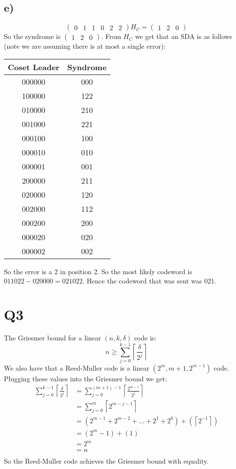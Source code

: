 \documentclass{article}
\begin{document}
\subsection*{e)}
$$\begin{pmatrix}0&1&1&0&2&2\end{pmatrix}H_C=\begin{pmatrix}1&2&0\end{pmatrix}$$
So the syndrome is $\begin{pmatrix}1&2&0\end{pmatrix}$. From $H_C$ we get that an SDA is as follows (note we are assuming there is at most a single error):
\begin{center}
\begin{tabular}{||c c||} 
 \hline
 Coset Leader &  Syndrome\\ [0.5ex] 
 \hline\hline
 000000 & 000\\ 
 \hline
 100000 & 122\\
 \hline
 010000 & 210\\
 \hline
 001000 & 221\\
 \hline
 000100 & 100\\
 \hline
 000010 & 010\\
 \hline
 000001 & 001\\
 \hline
 200000 & 211\\
 \hline
 020000 & 120\\
 \hline
 002000 & 112\\ 
 \hline
 000200 & 200\\
 \hline
 000020 & 020\\
 \hline
 000002 & 002\\  [1ex] 
 \hline
\end{tabular}
\end{center}
So the error is a 2 in position 2. So the most likely codeword is $011022-020000=021022$. Hence the codeword that was sent was $021$. 
\section*{Q3}
The Griesmer bound for a linear $(n,k,\delta)$ code is:
$$n\geq\sum_{j=0}^{k-1}\left\lceil\frac{\delta}{2^j}\right\rceil$$
We also have that a Reed-Muller code is a linear $(2^m,m+1,2^{m-1})$ code. Plugging these values into the Griesmer bound we get:
\begin{align*}
\sum_{j=0}^{k-1}\left\lceil\frac{\delta}{2^j}\right\rceil&=\sum_{j=0}^{(m+1)-1}\left\lceil\frac{2^{m-1}}{2^j}\right\rceil\\
&=\sum_{j=0}^{m}\left\lceil2^{m-j-1}\right\rceil\\
&=(2^{m-1}+2^{m-2}+...+2^{1}+2^{0})+\left(\left\lceil2^{-1}\right\rceil\right)\\
&=(2^m-1)+(1)\\
&=2^m\\
&=n\\
\end{align*}
So the Reed-Muller code achieves the Griesmer bound with equality.
\end{document}
